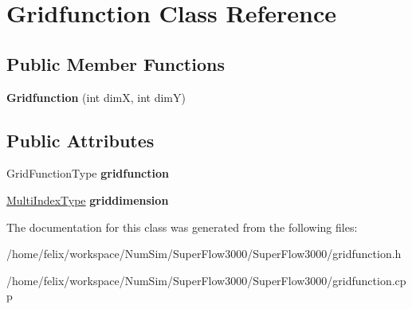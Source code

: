 \hypertarget{class_gridfunction}{\section{Gridfunction Class Reference}
\label{class_gridfunction}
}
\subsection*{Public Member Functions}
\begin{DoxyCompactItemize}
\item 
\hypertarget{class_gridfunction_a8abc8eee50819130486b9850cc6dd7c4}{{\bfseries Gridfunction} (int dim\-X, int dim\-Y)}\label{class_gridfunction_a8abc8eee50819130486b9850cc6dd7c4}

\end{DoxyCompactItemize}
\subsection*{Public Attributes}
\begin{DoxyCompactItemize}
\item 
\hypertarget{class_gridfunction_a143fb7f141bfbcbffb082782d9c22f8e}{Grid\-Function\-Type {\bfseries gridfunction}}\label{class_gridfunction_a143fb7f141bfbcbffb082782d9c22f8e}

\item 
\hypertarget{class_gridfunction_a6621fbb1bde0ef37645a67cd687974df}{\hyperlink{class_array}{Multi\-Index\-Type} {\bfseries griddimension}}\label{class_gridfunction_a6621fbb1bde0ef37645a67cd687974df}

\end{DoxyCompactItemize}


The documentation for this class was generated from the following files\-:\begin{DoxyCompactItemize}
\item 
/home/felix/workspace/\-Num\-Sim/\-Super\-Flow3000/\-Super\-Flow3000/gridfunction.\-h\item 
/home/felix/workspace/\-Num\-Sim/\-Super\-Flow3000/\-Super\-Flow3000/gridfunction.\-cpp\end{DoxyCompactItemize}
